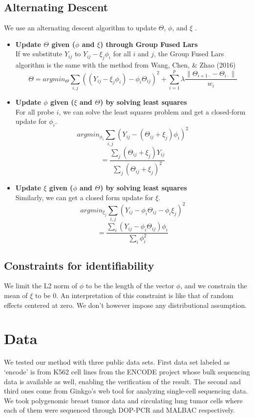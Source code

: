 \documentclass[11pt]{article}
\begin{document}
\subsection{Alternating Descent}
We use an alternating descent algorithm to update $\Theta$, $\phi$, and $\xi$ \cite{wang2016estimating}. 
\begin{itemize}
\item
\textbf{Update $\Theta$ given ($\phi$ and $\xi$) through Group Fused Lars \cite{bleakley2011group}}\\
If we substitute $Y_{ij}$ to $Y_{ij} - \xi_j \phi_i$ for all $i$ and $j$, the Group Fused Lars algorithm is the same with the method from Wang, Chen, \& Zhao (2016) \cite{wang2016estimating}
$$\Theta = argmin_{\Theta} \sum_{i,j} ((Y_{ij} - \xi_j \phi_i) - \phi_i \Theta_{ij})^2 + \sum_{i=1}^{p} \lambda \frac{\|\Theta_{i+1\cdot} - \Theta_{i\cdot}  \|}{w_i} $$

\item
\textbf{Update $\phi$  given ($\xi$ and $\Theta$) by solving least squares}\\
For all probe $i$, we can solve the least squares problem and get a closed-form update for $\phi_i$. 
$$argmin_{\phi_i} \sum_{i,j}(Y_{ij} - (\Theta_{ij}+\xi_j)\phi_i)^2$$
$$ =  \frac{\sum_j (\Theta_{ij} + \xi_j)Y_{ij}}{
\sum_j (\Theta_{ij}+\xi_j)^2
}$$
\item
\textbf{Update $\xi$ given ($\phi$ and $\Theta$) by solving least squares}\\
Similarly, we can get a closed form update for $\xi$.
$$argmin_{\xi_j} \sum_{i,j} (Y_{ij} - \phi_i \Theta_{ij} - \phi_i \xi_j)^2$$
$$= \frac{
\sum_i (Y_{ij}-\phi_i \Theta_{ij})\phi_i
}{
\sum_i \phi_i^2
}$$
\end{itemize}

\subsection{Constraints for identifiability}
\noindent We limit the L2 norm of $\phi$ to be the length of the vector $\phi$, and we constrain the mean of $\xi$ to be 0. An interpretation of this constraint is like that of random effects centered at zero. We don't however impose any distributional assumption.

\section{Data}
We tested our method with three public data sets. First data set labeled as `encode' is from K562 cell lines from the ENCODE project whose bulk sequencing data is available as well, enabling the verification of the result. The second and third ones come from Ginkgo's web tool for analyzing single-cell sequencing data. We took polygenomic breast tumor data and circulating lung tumor cells where each of them were sequenced through DOP-PCR and MALBAC respectively. \\
\end{document}
